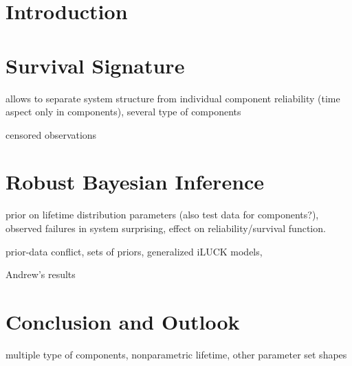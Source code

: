 \documentclass[authoryear]{elsarticle}
\begin{document}
\section{Introduction}



\section{Survival Signature}

allows to separate system structure from individual component reliability (time aspect only in components),
several type of components

censored observations


\section{Robust Bayesian Inference}

prior on lifetime distribution parameters (also test data for components?),
observed failures in system surprising,
effect on reliability/survival function.

prior-data conflict, sets of priors,
generalized iLUCK models, 

Andrew's results


\section{Conclusion and Outlook}


multiple type of components, nonparametric lifetime, other parameter set shapes 
\end{document}
